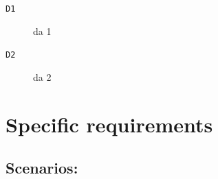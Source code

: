 \documentclass[12pt]{article}
\begin{document}
      \begin{description}
        \item[\texttt{D1}] da 1
        \item[\texttt{D2}] da 2
      \end{description}


\clearpage
\section{Specific requirements}
\label{sec:specreq}

\subsection{Scenarios:}

\end{document}
